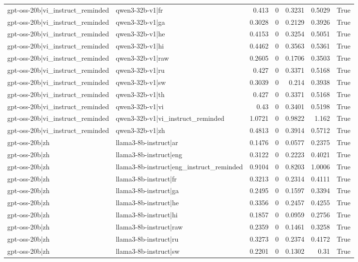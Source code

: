 \begin{table}
\begin{tabular}{l l r r r r l}
gpt-oss-20b|vi_instruct_reminded & qwen3-32b-v1|fr & 0.413 & 0 & 0.3231 & 0.5029 & True \\
gpt-oss-20b|vi_instruct_reminded & qwen3-32b-v1|ga & 0.3028 & 0 & 0.2129 & 0.3926 & True \\
gpt-oss-20b|vi_instruct_reminded & qwen3-32b-v1|he & 0.4153 & 0 & 0.3254 & 0.5051 & True \\
gpt-oss-20b|vi_instruct_reminded & qwen3-32b-v1|hi & 0.4462 & 0 & 0.3563 & 0.5361 & True \\
gpt-oss-20b|vi_instruct_reminded & qwen3-32b-v1|raw & 0.2605 & 0 & 0.1706 & 0.3503 & True \\
gpt-oss-20b|vi_instruct_reminded & qwen3-32b-v1|ru & 0.427 & 0 & 0.3371 & 0.5168 & True \\
gpt-oss-20b|vi_instruct_reminded & qwen3-32b-v1|sw & 0.3039 & 0 & 0.214 & 0.3938 & True \\
gpt-oss-20b|vi_instruct_reminded & qwen3-32b-v1|th & 0.427 & 0 & 0.3371 & 0.5168 & True \\
gpt-oss-20b|vi_instruct_reminded & qwen3-32b-v1|vi & 0.43 & 0 & 0.3401 & 0.5198 & True \\
gpt-oss-20b|vi_instruct_reminded & qwen3-32b-v1|vi_instruct_reminded & 1.0721 & 0 & 0.9822 & 1.162 & True \\
gpt-oss-20b|vi_instruct_reminded & qwen3-32b-v1|zh & 0.4813 & 0 & 0.3914 & 0.5712 & True \\
gpt-oss-20b|zh & llama3-8b-instruct|ar & 0.1476 & 0 & 0.0577 & 0.2375 & True \\
gpt-oss-20b|zh & llama3-8b-instruct|eng & 0.3122 & 0 & 0.2223 & 0.4021 & True \\
gpt-oss-20b|zh & llama3-8b-instruct|eng_instruct_reminded & 0.9104 & 0 & 0.8203 & 1.0006 & True \\
gpt-oss-20b|zh & llama3-8b-instruct|fr & 0.3213 & 0 & 0.2314 & 0.4111 & True \\
gpt-oss-20b|zh & llama3-8b-instruct|ga & 0.2495 & 0 & 0.1597 & 0.3394 & True \\
gpt-oss-20b|zh & llama3-8b-instruct|he & 0.3356 & 0 & 0.2457 & 0.4255 & True \\
gpt-oss-20b|zh & llama3-8b-instruct|hi & 0.1857 & 0 & 0.0959 & 0.2756 & True \\
gpt-oss-20b|zh & llama3-8b-instruct|raw & 0.2359 & 0 & 0.1461 & 0.3258 & True \\
gpt-oss-20b|zh & llama3-8b-instruct|ru & 0.3273 & 0 & 0.2374 & 0.4172 & True \\
gpt-oss-20b|zh & llama3-8b-instruct|sw & 0.2201 & 0 & 0.1302 & 0.31 & True \\

\end{tabular}
\end{table}
